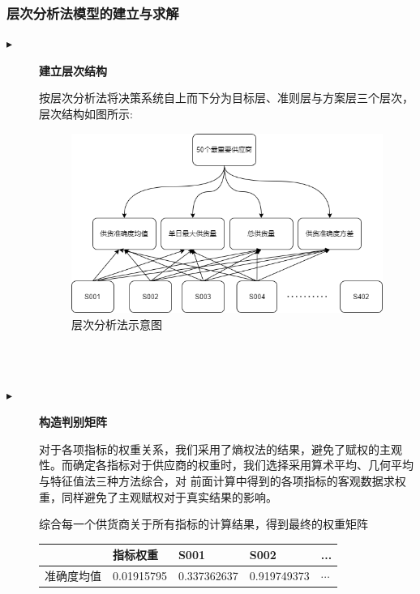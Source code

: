 \documentclass[withoutpreface,bwprint]{cumcmthesis}
\begin{document}
\subsubsection*{层次分析法模型的建立与求解}
\begin{description}
    \item[$\blacktriangleright$] \textbf{建立层次结构}\par
        按层次分析法将决策系统自上而下分为目标层、准则层与方案层三个层次，层次结构如图所示:
        \begin{figure}[htbp]
            \centering
            \includegraphics[scale=0.6]{AHP.png}
            \caption{层次分析法示意图}     \label{fig:3}
        \end{figure}
        \\
        \\
    \item[$\blacktriangleright$] \textbf{构造判别矩阵}\par
        对于各项指标的权重关系，我们采用了熵权法的结果，避免了赋权的主观性。而确定各指标对于供应商的权重时，我们选择采用算术平均、几何平均与特征值法三种方法综合，对
        前面计算中得到的各项指标的客观数据求权重，同样避免了主观赋权对于真实结果的影响。\par
        综合每一个供货商关于所有指标的计算结果，得到最终的权重矩阵\par
        \begin{table}[htbp]
            \begin{tabular}{|l|l|l|l|l|}
                \hline
                                         & 指标权重    & S001        & S002        & ...      \\
                \hline
                准确度均值               & 0.01915795  & 0.337362637 & 0.919749373 & $\cdots$ \\

\end{tabular}
\end{table}
\end{description}
\end{document}

